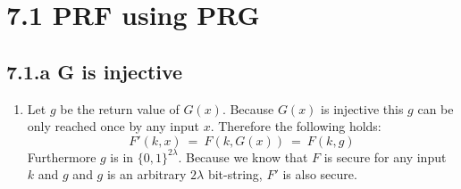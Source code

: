 \documentclass{report}
\begin{document}
	\pagestyle{fancy}
	
	\section*{7.1 PRF using PRG}
	\subsection*{7.1.a G is injective}
	\begin{enumerate}[]
		\item Let $g$ be the return value of $G(x)$. Because $G(x)$  is injective this $g$ can be only reached once by any input $x$. Therefore the following holds:
		\[
			F'(k,x) \ = \ F(k, G(x)) \ = \ F(k, g)
		\]
		Furthermore $g$ is in $\{ 0,1 \} ^{2 \lambda}$. Because we know that $F$ is secure for any input $k$ and $g$ and $g$ is an arbitrary $2 \lambda$ bit-string, $F'$ is also secure.
	\end{enumerate}
\end{document}
